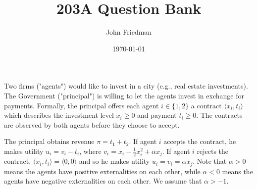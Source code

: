 \documentclass[answers]{exam}
\title{203A Question Bank}
\author{John Friedman}
\date{\today}
\begin{document}
\maketitle

\begin{questions}
    \question Two firms ("agents") would like to invest in a city (e.g., real estate investments). The Government ("principal") is willing to let the agents invest in exchange for payments. Formally, the principal offers each agent $i \in \{1, 2\}$ a contract $\langle x_i, t_i \rangle$ which describes the investment level $x_i \geq 0$ and payment $t_i \geq 0$. The contracts are observed by both agents before they choose to accept.

    The principal obtains revenue $\pi = t_1 + t_2$. If agent $i$ accepts the contract, he makes utility $u_i = v_i - t_i$, where $v_i = x_i - \frac{1}{2} x_i^2 + \alpha x_j$. If agent $i$ rejects the contract, $\langle x_i, t_i \rangle = \langle 0, 0 \rangle$ and so he makes utility $u_i = v_i = \alpha x_j$. Note that $\alpha > 0$ means the agents have positive externalities on each other, while $\alpha < 0$ means the agents have negative externalities on each other. We assume that $\alpha > -1$.
\end{questions}
\end{document}
